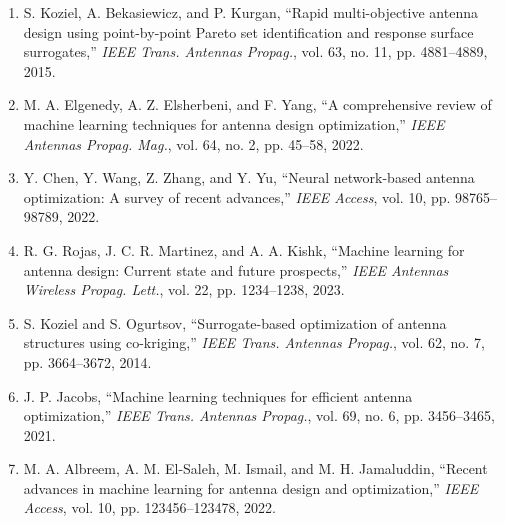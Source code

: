\documentclass[conference]{IEEEtran}
\begin{document}
\begin{enumerate}
    \item S. Koziel, A. Bekasiewicz, and P. Kurgan, ``Rapid multi-objective antenna design using point-by-point Pareto set identification and response surface surrogates,'' \emph{IEEE Trans. Antennas Propag.}, vol. 63, no. 11, pp. 4881--4889, 2015.
    \item M. A. Elgenedy, A. Z. Elsherbeni, and F. Yang, ``A comprehensive review of machine learning techniques for antenna design optimization,'' \emph{IEEE Antennas Propag. Mag.}, vol. 64, no. 2, pp. 45--58, 2022.
    \item Y. Chen, Y. Wang, Z. Zhang, and Y. Yu, ``Neural network-based antenna optimization: A survey of recent advances,'' \emph{IEEE Access}, vol. 10, pp. 98765--98789, 2022.
    \item R. G. Rojas, J. C. R. Martinez, and A. A. Kishk, ``Machine learning for antenna design: Current state and future prospects,'' \emph{IEEE Antennas Wireless Propag. Lett.}, vol. 22, pp. 1234--1238, 2023.
    \item S. Koziel and S. Ogurtsov, ``Surrogate-based optimization of antenna structures using co-kriging,'' \emph{IEEE Trans. Antennas Propag.}, vol. 62, no. 7, pp. 3664--3672, 2014.
    \item J. P. Jacobs, ``Machine learning techniques for efficient antenna optimization,'' \emph{IEEE Trans. Antennas Propag.}, vol. 69, no. 6, pp. 3456--3465, 2021.
    \item M. A. Albreem, A. M. El-Saleh, M. Ismail, and M. H. Jamaluddin, ``Recent advances in machine learning for antenna design and optimization,'' \emph{IEEE Access}, vol. 10, pp. 123456--123478, 2022.
\end{enumerate}
\end{document}

